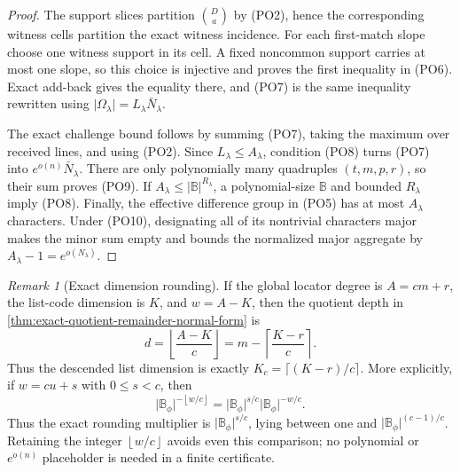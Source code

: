 \documentclass[12pt,a4paper]{amsart}
\numberwithin{equation}{section}
\theoremstyle{remark}
\newtheorem{remark}[remark]{Remark}
\newcommand{\B}{\mathbb B}
\newcommand{\abs}[1]{\lvert #1\rvert}
\newcommand{\floor}[1]{\left\lfloor #1\right\rfloor}
\begin{document}
\begin{proof}
The support slices partition \(\binom Da\) by \textup{(PO2)}, hence the
corresponding witness cells partition the exact witness incidence.  For
each first-match slope choose one witness support in its cell.  A fixed
noncommon support carries at most one slope, so this choice is injective
and proves the first inequality in \textup{(PO6)}.  Exact add-back gives
the equality there, and \textup{(PO7)} is the same inequality rewritten
using \(\abs{\Omega_\lambda}=L_\lambda\bar N_\lambda\).

The exact challenge bound follows by summing \textup{(PO7)}, taking the
maximum over received lines, and using \textup{(PO2)}.  Since
\(L_\lambda\le A_\lambda\), condition \textup{(PO8)} turns
\textup{(PO7)} into
\(e^{o(n)}\bar N_\lambda\).  There are only polynomially many quadruples
\((t,m,p,r)\), so their sum proves \textup{(PO9)}.  If
\(A_\lambda\le\abs\B^{R_\lambda}\), a polynomial-size \(\B\) and
bounded \(R_\lambda\) imply \textup{(PO8)}.  Finally, the effective
difference group in \textup{(PO5)} has at most \(A_\lambda\) characters.
Under \textup{(PO10)}, designating all of its nontrivial characters major
makes the minor sum empty and bounds the normalized major aggregate by
\(A_\lambda-1=e^{o(N_\lambda)}\).
\end{proof}

\begin{remark}[Exact dimension rounding]
\label{rem:qr-rounding}
If the global locator degree is $A=cm+r$, the list-code dimension is $K$,
and $w=A-K$, then the quotient depth in
\cref{thm:exact-quotient-remainder-normal-form} is
\[
 d=\left\lfloor\frac{A-K}{c}\right\rfloor
   =m-\left\lceil\frac{K-r}{c}\right\rceil.         \tag{QR5b}\label{eq:qr-rounding}
\]
Thus the descended list dimension is exactly
\(K_c=\lceil(K-r)/c\rceil\).  More explicitly, if \(w=cu+s\) with
\(0\le s<c\), then
\[
 \abs{\B_\phi}^{-\floor{w/c}}
 =\abs{\B_\phi}^{s/c}\abs{\B_\phi}^{-w/c}.          \tag{QR5c}
\]
Thus the exact rounding multiplier is \(\abs{\B_\phi}^{s/c}\), lying
between one and \(\abs{\B_\phi}^{(c-1)/c}\).  Retaining the integer
\(\floor{w/c}\) avoids even this comparison; no polynomial or
\(e^{o(n)}\) placeholder is needed in a finite certificate.
\end{remark}
\end{document}
